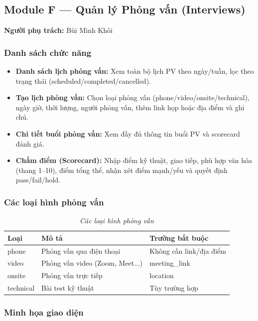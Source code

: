 \subsection{Module F --- Quản lý Phỏng vấn (Interviews)}
\textbf{Người phụ trách:} Bùi Minh Khôi

\subsubsection*{Danh sách chức năng}
\begin{itemize}
    \item \textbf{Danh sách lịch phỏng vấn:} Xem toàn bộ lịch PV theo ngày/tuần, lọc theo trạng thái (scheduled/completed/cancelled).
    \item \textbf{Tạo lịch phỏng vấn:} Chọn loại phỏng vấn (phone/video/onsite/technical), ngày giờ, thời lượng, người phỏng vấn, thêm link họp hoặc địa điểm và ghi chú.
    \item \textbf{Chi tiết buổi phỏng vấn:} Xem đầy đủ thông tin buổi PV và scorecard đánh giá.
    \item \textbf{Chấm điểm (Scorecard):} Nhập điểm kỹ thuật, giao tiếp, phù hợp văn hóa (thang 1--10), điểm tổng thể, nhận xét điểm mạnh/yếu và quyết định pass/fail/hold.
\end{itemize}

\subsubsection*{Các loại hình phỏng vấn}
\begin{table}[H]
    \centering
    \renewcommand{\arraystretch}{1.3}
    \begin{tabular}{|l|l|l|}
        \hline
        \textbf{Loại} & \textbf{Mô tả} & \textbf{Trường bắt buộc} \\ \hline
        phone & Phỏng vấn qua điện thoại & Không cần link/địa điểm \\ \hline
        video & Phỏng vấn video (Zoom, Meet...) & meeting\_link \\ \hline
        onsite & Phỏng vấn trực tiếp & location \\ \hline
        technical & Bài test kỹ thuật & Tùy trường hợp \\ \hline
    \end{tabular}
    \caption{\textit{Các loại hình phỏng vấn}}
\end{table}

\subsubsection*{Minh họa giao diện}


